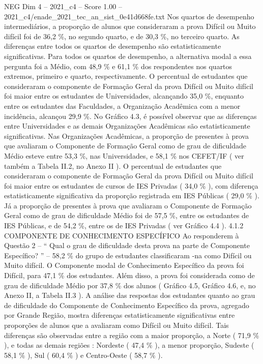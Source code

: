 \begin{textsample}{NEG Dim 4 – 2021\_c4 – Score 1.00 – 2021\_c4/enade\_2021\_tec\_an\_sist\_0e41d668fe.txt}
Nos quartos de desempenho intermediários, a proporção de alunos que consideraram a prova Difícil ou Muito difícil foi de 36,2 \%, no segundo quarto, e de 30,3 \%, no terceiro quarto.
As diferenças entre todos os quartos de desempenho são estatisticamente significativas.
Para todos os quartos de desempenho, a alternativa modal a essa pergunta foi a Médio, com 48,9 \% e 61,1 \% dos respondentes nos quartos extremos, primeiro e quarto, respectivamente.
O percentual de estudantes que consideraram o componente de Formação Geral da prova Difícil ou Muito difícil foi maior entre os estudantes de Universidades, alcançando 35,0 \%, enquanto entre os estudantes das Faculdades, a Organização Acadêmica com a menor incidência, alcançou 29,9 \%.
No Gráfico 4.3, é possível observar que as diferenças entre Universidades e as demais Organizações Acadêmicas são estatisticamente significativas.
Nas Organizações Acadêmicas, a proporção de presentes à prova que avaliaram o Componente de Formação Geral como de grau de dificuldade Médio esteve entre 53,3 \%, nas Universidades, e 58,1 \% nos CEFET/IF ( ver também a Tabela II.2, no Anexo II ).
O percentual de estudantes que consideraram o componente de Formação Geral da prova Difícil ou Muito difícil foi maior entre os estudantes de cursos de IES Privadas ( 34,0 \% ), com diferença estatisticamente significativa da proporção registrada em IES Públicas ( 29,0 \% ).
Já a proporção de presentes à prova que avaliaram o Componente de Formação Geral como de grau de dificuldade Médio foi de 57,5 \%, entre os estudantes de IES Públicas, e de 54,2 \%, entre os de IES Privadas ( ver Gráfico 4.4 ). 4.1.2 COMPONENTE DE CONHECIMENTO ESPECÍFICO Ao responderem à Questão 2 – “ Qual o grau de dificuldade desta prova na parte de Componente Específico? ” – 58,2 \% do grupo de estudantes classificaram -na como Difícil ou Muito difícil.
O Componente modal de Conhecimento Específico da prova foi Difícil, para 47,1 \% dos estudantes.
Além disso, a prova foi considerada como de grau de dificuldade Médio por 37,8 \% dos alunos ( Gráfico 4.5, Gráfico 4.6, e, no Anexo II, a Tabela II.3 ).
A análise das respostas dos estudantes quanto ao grau de dificuldade do Componente de Conhecimento Específico da prova, agregado por Grande Região, mostra diferenças estatisticamente significativas entre proporções de alunos que a avaliaram como Difícil ou Muito difícil.
Tais diferenças são observadas entre a região com a maior proporção, a Norte ( 71,9 \% ), e todas as demais regiões : Nordeste ( 47,4 \% ), a menor proporção, Sudeste ( 58,1 \% ), Sul ( 60,4 \% ) e Centro-Oeste ( 58,7 \% ).

\end{textsample}
